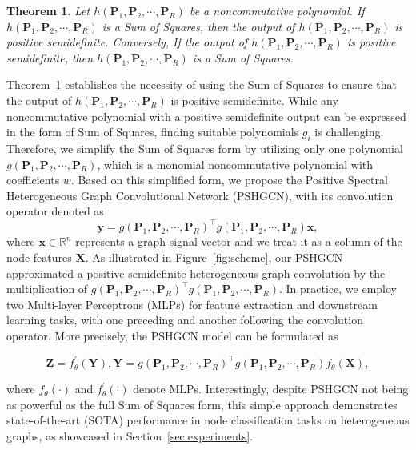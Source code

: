 \documentclass{article}
\newtheorem{theorem}{Theorem}[section]
\begin{document}
\begin{theorem}\label{th_sos_posi}
{\rm \cite{positive-poly}} Let $h(\mathbf{P}_1,\mathbf{P}_2,\cdots,\mathbf{P}_R)$ be a noncommutative polynomial. If $h(\mathbf{P}_1,\mathbf{P}_2,\cdots,\mathbf{P}_R)$ is a Sum of Squares, then the output of $h(\mathbf{P}_1,\mathbf{P}_2,\cdots,\mathbf{P}_R)$ is positive semidefinite. Conversely,   If the output of $h(\mathbf{P}_1,\mathbf{P}_2,\cdots,\mathbf{P}_R)$ is positive semidefinite, then $h(\mathbf{P}_1,\mathbf{P}_2,\cdots,\mathbf{P}_R)$ is a Sum of Squares.
\end{theorem}

Theorem~\ref{th_sos_posi} establishes the necessity of using the Sum of Squares to ensure that the output of $h(\mathbf{P}_1,\mathbf{P}_2,\cdots,\mathbf{P}_R)$ is positive semidefinite.  While any noncommutative polynomial with a positive semidefinite output can be expressed in the form of Sum of Squares, finding suitable polynomials $g_i$ is challenging. Therefore, we simplify the Sum of Squares form by utilizing only one polynomial $g(\mathbf{P}_1,\mathbf{P}_2,\cdots,\mathbf{P}_R)$, which is a monomial noncommutative polynomial with coefficients $w$. Based on this simplified form, we propose the Positive Spectral Heterogeneous Graph Convolutional Network (PSHGCN), with its convolution operator denoted as
\begin{equation}
\mathbf{y}= g(\mathbf{P}_1,\mathbf{P}_2,\cdots,\mathbf{P}_R)^{\top}g(\mathbf{P}_1,\mathbf{P}_2,\cdots,\mathbf{P}_R)\mathbf{x},
\end{equation}
where $\mathbf{x} \in \mathbb{R}^n$  represents a graph signal vector and we treat it as a column of the node features $\mathbf{X}$. As illustrated in Figure~\ref{fig:scheme}, our PSHGCN approximated a positive semidefinite heterogeneous graph convolution by the multiplication of  $g(\mathbf{P}_1,\mathbf{P}_2,\cdots,\mathbf{P}_R)^{\top} g(\mathbf{P}_1,\mathbf{P}_2,\cdots,\mathbf{P}_R)$. In practice, we employ two Multi-layer Perceptrons (MLPs) for feature extraction and downstream learning tasks, with one preceding and another following the convolution operator. More precisely, the PSHGCN model can be formulated as
\begin{tcolorbox}[height=13mm,boxrule=0.5pt,valign=center]
\begin{equation}
\label{eq:pshgcn}
    \mathbf{Z}=f^{\prime}_{\theta}(\mathbf{Y}), \mathbf{Y}=g(\mathbf{P}_1,\mathbf{P}_2,\cdots,\mathbf{P}_R)^{\top} g(\mathbf{P}_1,\mathbf{P}_2,\cdots,\mathbf{P}_R)f_{\theta}(\mathbf{X}), 
\end{equation}
\end{tcolorbox}
where $f_{\theta}(\cdot)$ and $f^{\prime}_{\theta}(\cdot)$ denote MLPs. Interestingly, despite PSHGCN not being as powerful as the full Sum of Squares form, this simple approach demonstrates state-of-the-art (SOTA) performance in node classification tasks on heterogeneous graphs, as showcased in Section~\ref{sec:experiments}.
\end{document}
